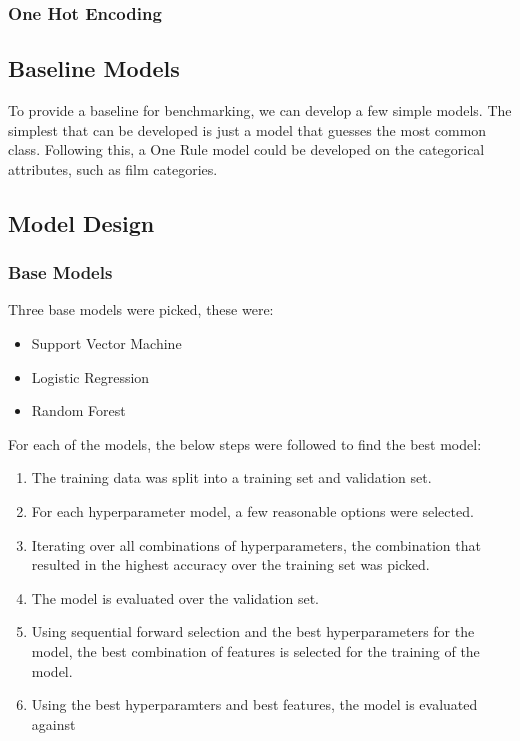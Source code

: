 \subsubsection{One Hot Encoding}

\subsection{Baseline Models}
To provide a baseline for benchmarking, we can develop a few simple models. The simplest that can be developed is just a model that guesses the most common class. Following this, a One Rule model could be developed on the categorical attributes, such as film categories.

\subsection{Model Design}
\subsubsection{Base Models}

Three base models were picked, these were:

\begin{itemize}
    \item Support Vector Machine
    \item Logistic Regression
    \item Random Forest
\end{itemize}

For each of the models, the below steps were followed to find the best model:

\begin{enumerate}
    \item The training data was split into a training set and validation set.
    \item For each hyperparameter model, a few reasonable options were selected.
    \item Iterating over all combinations of hyperparameters, the combination that resulted in the highest accuracy over the training set was picked.
    \item The model is evaluated over the validation set.
    \item Using sequential forward selection and the best hyperparameters for the model, the best combination of features is selected for the training of the model. 
    \item Using the best hyperparamters and best features, the model is evaluated against 

\end{enumerate}

